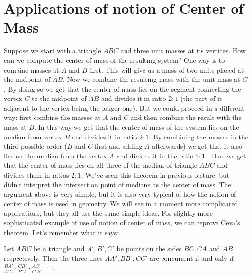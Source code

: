 \section{Applications of notion of Center of Mass}
Suppose we start with a triangle $ABC$ and three unit masses at its vertices. How can we compute the center of mass of the resulting system? One way is to combine masses at $A$ and $B$ first. This will give us a mass of two units placed at the midpoint of $AB$. Now we combine the resulting mass with the unit mass at $C$. By doing so we get that the center of mass lies on the segment connecting the vertex $C$ to the midpoint of $AB$ and divides it in ratio $2:1$ (the part of it adjacent to the vertex being the longer one). But we could proceed in a different way: first combine the masses at $A$ and $C$ and then combine the result with the mass at $B$. In this way we get that the center of mass of the system lies on the median from vertex $B$ and divides it in ratio $2:1$. By combining the masses in the third possible order ($B$ and $C$ first and adding $A$ afterwards) we get that it also lies on the median from the vertex $A$ and divides it in the ratio $2:1$. Thus we get that the center of mass lies on all three of the median of triangle $ABC$ and divides them in ratios $2:1$. We've seen this theorem in previous lecture, but didn't interpret the intersection point of medians as the center of mass.
The argument above is very simple, but it is also very typical of how the notion of center of mass is used in geometry. We will see in a moment more complicated applications, but they all use the same simple ideas.
For slightly more sophisticated example of use of notion of center of mass, we can reprove Ceva's theorem. Let's remember what it says:
\begin{theorem}
Let $ABC$ be a triangle and $A', B', C'$ be points on the sides $BC, CA$ and $AB$ respectively. Then the three lines $AA', BB', CC'$ are concurrent if and only if $\frac{BA'}{A'C}\cdot\frac{CB'}{B'A}\cdot\frac{AC'}{C'B}=1$.
\end{theorem}
